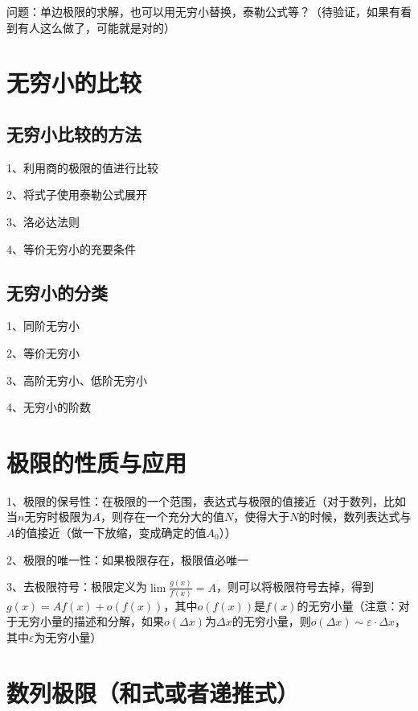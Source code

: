 问题：单边极限的求解，也可以用无穷小替换，泰勒公式等？（待验证，如果有看到有人这么做了，可能就是对的）

\section{无穷小的比较}



\subsection{无穷小比较的方法}

1、利用商的极限的值进行比较

2、将式子使用泰勒公式展开

3、洛必达法则

4、等价无穷小的充要条件



\subsection{无穷小的分类}

1、同阶无穷小

2、等价无穷小

3、高阶无穷小、低阶无穷小

4、无穷小的阶数

\section{极限的性质与应用}

1、极限的保号性：在极限的一个范围，表达式与极限的值接近（对于数列，比如当$n$无穷时极限为$A$，则存在一个充分大的值$N$，使得大于$N$的时候，数列表达式与$A$的值接近（做一下放缩，变成确定的值$A_0$））

2、极限的唯一性：如果极限存在，极限值必唯一

3、去极限符号：极限定义为$\lim \frac{g(x)}{f(x)}=A$，则可以将极限符号去掉，得到$g(x) = Af(x)+o(f(x))$，其中$o(f(x))$是$f(x)$的无穷小量（注意：对于无穷小量的描述和分解，如果$o(\Delta x)$为$\Delta x$的无穷小量，则$o(\Delta x) \sim \varepsilon·\Delta x$，其中$\varepsilon$为无穷小量）

\section{数列极限（和式或者递推式）}




